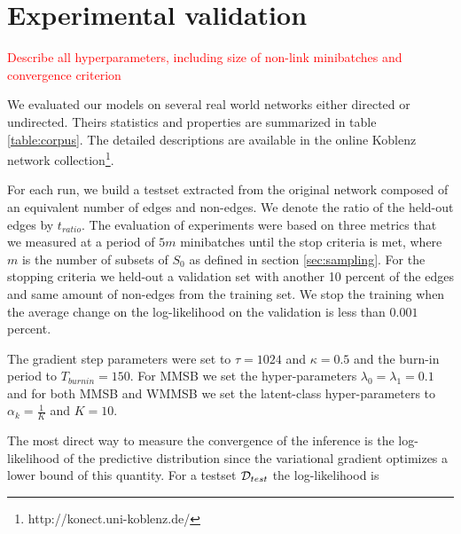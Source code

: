 \section{Experimental validation}
\label{sec:exps}

%
%

\textcolor{red}{Describe all hyperparameters, including size of non-link minibatches and convergence criterion}


We evaluated our models on several real world networks either directed or undirected. Theirs statistics and properties are summarized in table \ref{table:corpus}. The detailed descriptions are available in the online Koblenz network collection\footnote{http://konect.uni-koblenz.de/}.

\begin{table}[h]
\bgroup
\def\arraystretch{1} %
	
\egroup
\label{table:corpus}
\end{table}


%
%

For each run, we build a testset extracted from the original network composed of an equivalent number of edges and non-edges. We denote the ratio of the held-out edges by $t_{ratio}$. The evaluation of experiments were based on three metrics that we measured at a period of $5m$ minibatches until the stop criteria is met, where $m$ is the number of subsets of $S_0$ as defined in section \ref{sec:sampling}. For the stopping criteria we held-out a validation set with another 10 percent of the edges and same amount of non-edges from the training set. We stop the training when the average change on the log-likelihood on the validation is less than $0.001$ percent.

The gradient step parameters were set to $\tau=1024$ and $\kappa=0.5$ and the burn-in period  to $T_{burnin}=150$. For MMSB we set the hyper-parameters $\lambda_0=\lambda_1=0.1$ and for both MMSB and WMMSB we set the latent-class hyper-parameters to $\alpha_k=\frac{1}{K}$ and $K=10$.


%
%

The most direct way to measure the convergence of the inference is the log-likelihood of the predictive distribution since the variational gradient optimizes a lower bound of this quantity. For a testset $\mathcal{D}_{test}$ the log-likelihood is

\begin{figure}[h]
\centering
	
    \label{fig:conv_entropy}
\end{figure}

